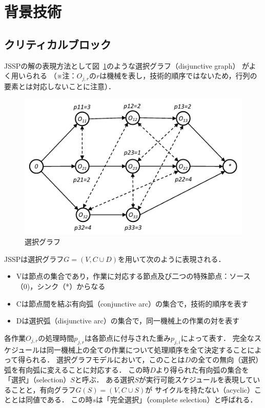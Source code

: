 \documentclass{jsarticle}
\begin{document}
\section{背景技術}
\subsection{クリティカルブロック}
JSSPの解の表現方法として図~\ref{fig:disjunctive_graph}のような選択グラフ（disjunctive graph）
がよく用いられる
（※注：$O_{j,r}$の$r$は機械を表し，技術的順序ではないため，行列の要素とは対応しないことに注意）．

\begin{figure}[H]
	\centering
	\includegraphics{figures/disjunctive_graph.pdf}
	\caption{選択グラフ}
	\label{fig:disjunctive_graph}
\end{figure}

JSSPは選択グラフ$G=(V,C\cup D)$を用いて次のように表現される．
\begin{itemize}
	\item Vは節点の集合であり，作業に対応する節点及び二つの特殊節点：ソース（0)，シンク（*）からなる
	\item Cは節点間を結ぶ有向弧（conjunctive arc）の集合で，技術的順序を表す
	\item Dは選択弧（disjunctive arc）の集合で，同一機械上の作業の対を表す
\end{itemize}
各作業$O_{j,r}$の処理時間$p_{j,r}$は各節点に付与された重み$p_{j,i}$によって表す．
完全なスケジュールは同一機械上の全ての作業について処理順序を全て決定することによって得られる．
選択グラフモデルにおいて，このことは$D$の全ての無向（選択）弧を有向弧に変えることに対応する．
この時$D$より得られた有向弧の集合を「選択」（selection）$S$と呼ぶ．
ある選択$S$が実行可能スケジュールを表現していることと，有向グラフ$G(S)=(V,C\cup S)$が
サイクルを持たない（acyclic）こととは同値である．
この時$s$は「完全選択」（complete selection）と呼ばれる．
\end{document}
